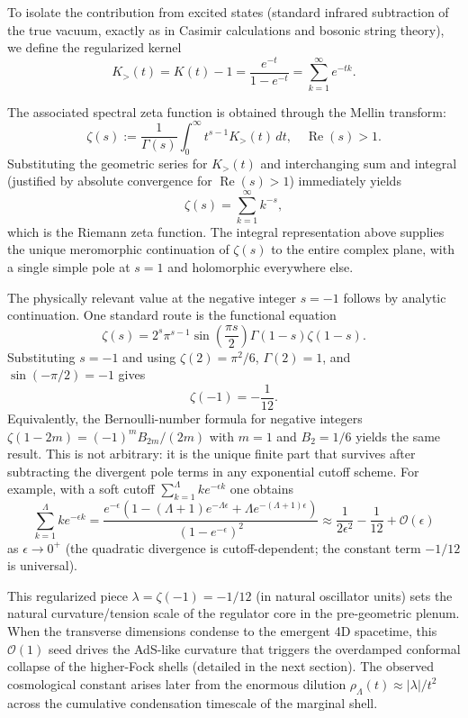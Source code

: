\documentclass[11pt,a4paper,oneside]{article}
\begin{document}
To isolate the contribution from excited states (standard infrared subtraction of the true vacuum, exactly as in Casimir calculations and bosonic string theory), we define the regularized kernel
\[
K_>(t) = K(t) - 1 = \frac{e^{-t}}{1 - e^{-t}} = \sum_{k=1}^\infty e^{-t k}.
\]

The associated spectral zeta function is obtained through the Mellin transform:
\[
\zeta(s) := \frac{1}{\Gamma(s)} \int_0^\infty t^{s-1} K_>(t) \, dt, \quad \operatorname{Re}(s) > 1.
\]
Substituting the geometric series for \(K_>(t)\) and interchanging sum and integral (justified by absolute convergence for \(\operatorname{Re}(s) > 1\)) immediately yields
\[
\zeta(s) = \sum_{k=1}^\infty k^{-s},
\]
which is the Riemann zeta function. The integral representation above supplies the unique meromorphic continuation of \(\zeta(s)\) to the entire complex plane, with a single simple pole at \(s=1\) and holomorphic everywhere else.

The physically relevant value at the negative integer \(s = -1\) follows by analytic continuation. One standard route is the functional equation
\[
\zeta(s) = 2^s \pi^{s-1} \sin\left(\frac{\pi s}{2}\right) \Gamma(1-s) \zeta(1-s).
\]
Substituting \(s = -1\) and using \(\zeta(2) = \pi^2/6\), \(\Gamma(2) = 1\), and \(\sin(-\pi/2) = -1\) gives
\[
\zeta(-1) = -\frac{1}{12}.
\]
Equivalently, the Bernoulli-number formula for negative integers \(\zeta(1-2m) = (-1)^m B_{2m}/(2m)\) with \(m=1\) and \(B_2 = 1/6\) yields the same result. This is not arbitrary: it is the unique finite part that survives after subtracting the divergent pole terms in any exponential cutoff scheme. For example, with a soft cutoff \(\sum_{k=1}^\Lambda k e^{-\epsilon k}\) one obtains
\[
\sum_{k=1}^\Lambda k e^{-\epsilon k} = \frac{e^{-\epsilon}(1 - (\Lambda+1)e^{-\Lambda\epsilon} + \Lambda e^{-(\Lambda+1)\epsilon})}{(1-e^{-\epsilon})^2} \approx \frac{1}{2\epsilon^2} - \frac{1}{12} + \mathcal{O}(\epsilon)
\]
as \(\epsilon \to 0^+\) (the quadratic divergence is cutoff-dependent; the constant term \(-1/12\) is universal).

This regularized piece \(\lambda = \zeta(-1) = -1/12\) (in natural oscillator units) sets the natural curvature/tension scale of the regulator core in the pre-geometric plenum. When the transverse dimensions condense to the emergent 4D spacetime, this \(\mathcal{O}(1)\) seed drives the AdS-like curvature that triggers the overdamped conformal collapse of the higher-Fock shells (detailed in the next section). The observed cosmological constant arises later from the enormous dilution \(\rho_\Lambda(t) \approx |\lambda|/t^2\) across the cumulative condensation timescale of the marginal shell.
\end{document}

